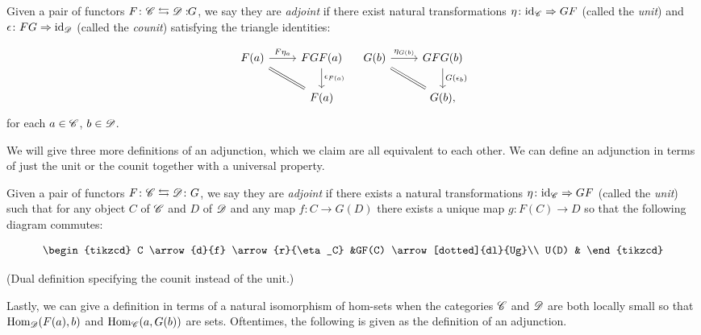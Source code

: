 \documentclass{article}[11pt]
\begin{document}
\begin{definition}\label{def1} Given a pair of functors $F\colon \mathscr{C} \leftrightarrows \mathscr{D}:\!\! G$, we say they are \textit{adjoint} if there exist natural transformations $\eta \colon \text{id}_{\mathscr{C}} \Rightarrow GF$ (called the \textit{unit}) and $\epsilon \colon FG \Rightarrow \text{id}_{\mathscr{D}}$ (called the \textit{counit}) satisfying the triangle identities:

\[
	\begin{tikzcd}
	F(a)\rar["F\eta_a" above]\ar[equal, dr] & FGF(a)\dar["\epsilon_{F(a)}" right] \\
	 & F(a)
	\end{tikzcd}\quad
	\begin{tikzcd}
	G(b)\rar["\eta_{G(b)}" above]\ar[equal, dr] & GFG(b)\dar["G(\epsilon_b)" right]\\
	& G(b),
	\end{tikzcd}
\]
for each $a\in \mathscr{C}$, $b\in \mathscr{D}$.

\end{definition}

We will give three more definitions of an adjunction, which we claim are all equivalent to each other. We can define an adjunction in terms of just the unit or the counit together with a universal property.

\begin{definition}\label{def2}
Given a pair of functors $F\colon \mathscr{C} \leftrightarrows \mathscr{D}\colon G$, we say they are \textit{adjoint} if there exists a natural transformations $\eta \colon \text{id}_{\mathscr{C}} \Rightarrow GF$ (called the \textit{unit}) such that for any object $C$ of $\mathscr{C}$ and $D$ of $\mathscr{D}$ and any map $f\colon C\to G(D)$ there exists a unique map $g \colon F(C) \to D$ so that the following diagram commutes:

\[\begin{tikzcd}
C \arrow{d}{f} \arrow{r}{\eta_C} &GF(C) \arrow[dotted]{dl}{Ug}\\
U(D)  & 
\end{tikzcd}\]
\end{definition} 

\begin{definition}\label{def3}
(Dual definition specifying the counit instead of the unit.)
\end{definition} 

Lastly, we can give a definition in terms of a natural isomorphism of hom-sets when the categories $\mathscr{C}$ and $\mathscr{D}$ are both locally small so that $\textup{Hom}_{\mathscr{D}}(F(a),b)$ and $\textup{Hom}_{\mathscr{C}}(a,G(b))$ are sets. Oftentimes, the following is given as the definition of an adjunction.
\end{document}
